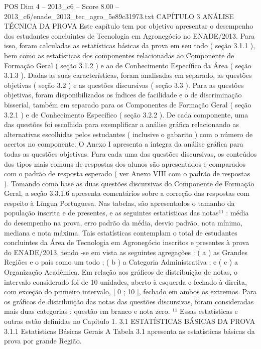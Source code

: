 \begin{textsample}{POS Dim 4 – 2013\_c6 – Score 8.00 – 2013\_c6/enade\_2013\_tec\_agro\_5e89c31973.txt}  \label{ex:f4_pos_048}
CAPÍTULO 3 ANÁLISE TÉCNICA DA PROVA Este capítulo tem por objetivo apresentar o desempenho dos estudantes concluintes de Tecnologia em Agronegócio no ENADE/2013.
Para isso, foram calculadas as estatísticas básicas da prova em seu todo ( seção 3.1.1 ), bem como as estatísticas dos componentes relacionadas ao Componente de Formação Geral ( seção 3.1.2 ) e ao de Conhecimento Específico da Área ( seção 3.1.3 ).
Dadas as suas características, foram analisadas em separado, as questões objetivas ( seção 3.2 ) e as questões discursivas ( seção 3.3 ).
Para as questões objetivas, foram disponibilizados os índices de facilidade e o de discriminação bisserial, também em separado para os Componentes de Formação Geral ( seção 3.2.1 ) e de Conhecimento Específico ( seção 3.2.2 ).
De cada componente, uma das questões foi escolhida para exemplificar a análise gráfica relacionando as alternativas escolhidas pelos estudantes ( inclusive o gabarito ) com o número de acertos no componente.
O Anexo I apresenta a íntegra da análise gráfica para todas as questões objetivas.
Para cada uma das questões discursivas, os conteúdos dos tipos mais comuns de respostas dos alunos são apresentados e comparados com o padrão de resposta esperado ( ver Anexo VIII com o padrão de respostas ).
Tomando como base as duas questões discursivas do Componente de Formação Geral, a seção 3.3.1.6 apresenta comentários sobre a correção das respostas com respeito à Língua Portuguesa.
Nas tabelas, são apresentados o tamanho da população inscrita e de presentes, e as seguintes estatísticas das notas¹¹ : média do desempenho na prova, erro padrão da média, desvio padrão, nota mínima, mediana e nota máxima.
Tais estatísticas contemplam o total de estudantes concluintes da Área de Tecnologia em Agronegócio inscritos e presentes à prova do ENADE/2013, tendo -se em vista as seguintes agregações : ( a ) as Grandes Regiões e o país como um todo ; ( b ) a Categoria Administrativa ; e ( c ) a Organização Acadêmica.
Em relação aos gráficos de distribuição de notas, o intervalo considerado foi de 10 unidades, aberto à esquerda e fechado à direita, com exceção do primeiro intervalo, [ 0 ; 10 ], fechado em ambos os extremos.
Para os gráficos de distribuição das notas das questões discursivas, foram consideradas mais duas categorias : questão em branco e nota zero. ¹¹ Essas estatísticas e outras estão definidas no Capítulo 1. 3.1 ESTATÍSTICAS BÁSICAS DA PROVA 3.1.1 Estatísticas Básicas Gerais A Tabela 3.1 apresenta as estatísticas básicas da prova por grande Região.

\end{textsample}

